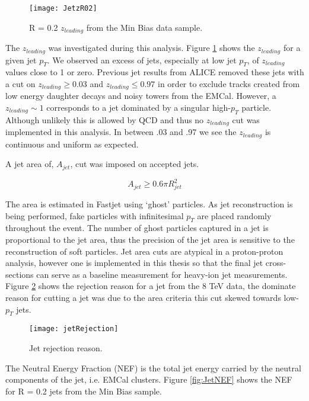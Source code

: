 \begin{figure}[h]
\texttt{[image: JetzR02]}
\centering
\caption{R = 0.2 $z_{leading}$ from the Min Bias data sample.}
\label{fig:Jetz}
\end{figure}

The $z_{leading}$ was investigated during this analysis. Figure \ref{fig:Jetz} shows the $z_{leading}$ for a given jet $p_{T}$.  We observed an excess of jets, especially at low jet $p_{T}$, of $z_{leading}$ values close to 1 or zero.  Previous jet results from ALICE removed these jets with a cut on $ z_{leading} \geq 0.03$ and $z_{leading} \leq 0.97$ in order to exclude tracks created from low energy daughter decays and noisy towers from the EMCal.  However, a $z_{leading} \sim 1$ corresponds to a jet dominated by a singular high-$p_{T}$ particle.  Although unlikely this is allowed by QCD and thus no $z_{leading}$ cut was implemented in this analysis.  In between .03 and .97 we see the $z_{leading}$ is continuous and uniform as expected.  

A jet area of, $A_{jet}$, cut was imposed on accepted jets.

\begin{equation}
A_{jet} \geq 0.6 \pi R_{jet}^{2}
\label{eq:AreaJet}
\end{equation}

\noindent
The area is estimated in Fastjet using `ghost' particles.  As jet reconstruction is being performed, fake particles with infinitesimal $p_{T}$ are placed randomly throughout the event.  The number of ghost particles captured in a jet is proportional to the jet area, thus the precision of the jet area is sensitive to the reconstruction of soft particles.  Jet area cuts are atypical in a proton-proton analysis, however one is implemented in this thesis so that the final jet cross-sections can serve as a baseline measurement for heavy-ion jet measurements.  Figure \ref{fig:jetRejection} shows the rejection reason for a jet from the 8 TeV data, the dominate reason for cutting a jet was due to the area criteria this cut skewed towards low-$p_{T}$ jets. 

\begin{figure}[h]
\texttt{[image: jetRejection]}
\centering
\caption{Jet rejection reason.}
\label{fig:jetRejection}
\end{figure}


The Neutral Energy Fraction (NEF) is the total jet energy carried by the neutral components of the jet, i.e. EMCal clusters.  Figure \ref{fig:JetNEF} shows the NEF for R = 0.2 jets from the Min Bias sample.

